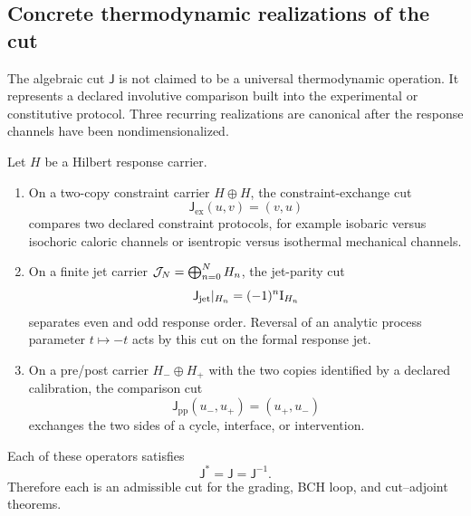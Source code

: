 \subsection{Concrete thermodynamic realizations of the cut}
\label{sec:thermodynamic-cut-realizations}

The algebraic cut $\mathsf J$ is not claimed to be a universal thermodynamic operation.  It represents a declared involutive comparison built into the experimental or constitutive protocol.  Three recurring realizations are canonical after the response channels have been nondimensionalized.

\begin{proposition}
Let $H$ be a Hilbert response carrier.

\begin{enumerate}[label=(\roman*)]
\item On a two-copy constraint carrier $H\oplus H$, the constraint-exchange cut
\begin{equation}
\mathsf J_{\mathrm{ex}}(u,v)=(v,u)
\label{eq:constraint-exchange-cut}
\end{equation}
compares two declared constraint protocols, for example isobaric versus isochoric caloric channels or isentropic versus isothermal mechanical channels.

\item On a finite jet carrier $\mathcal J_N=\bigoplus_{n=0}^NH_n$, the jet-parity cut
\begin{equation}
\mathsf J_{\mathrm{jet}}|_{H_n}=(-1)^n\mathrm I_{H_n}
\label{eq:jet-parity-cut}
\end{equation}
separates even and odd response order.  Reversal of an analytic process parameter $t\mapsto-t$ acts by this cut on the formal response jet.

\item On a pre/post carrier $H_-\oplus H_+$ with the two copies identified by a declared calibration, the comparison cut
\begin{equation}
\mathsf J_{\mathrm{pp}}(u_-,u_+)=(u_+,u_-)
\label{eq:pre-post-cut}
\end{equation}
exchanges the two sides of a cycle, interface, or intervention.
\end{enumerate}

Each of these operators satisfies
\[
\mathsf J^*=\mathsf J=\mathsf J^{-1}.
\]
Therefore each is an admissible cut for the grading, BCH loop, and cut--adjoint theorems.
\end{proposition}

